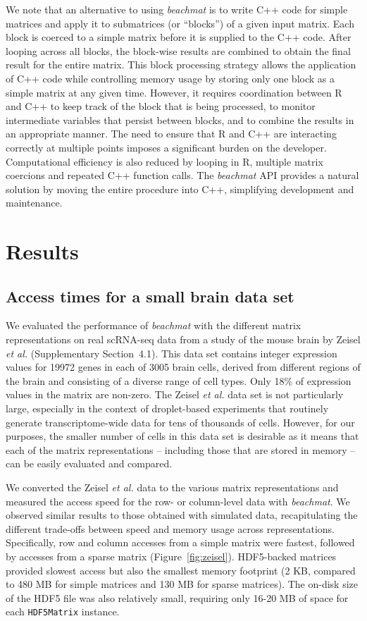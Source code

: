 \documentclass[10pt,letterpaper]{article}
\newcommand{\suppsecrealzeisel}{4.1}
\newcommand{\beachmat}{\textit{beachmat}}
\newcommand{\code}[1]{\texttt{#1}}
\begin{document}
We note that an alternative to using \beachmat{} is to write C++ code for simple matrices and apply it to submatrices (or ``blocks'') of a given input matrix.
Each block is coerced to a simple matrix before it is supplied to the C++ code.
After looping across all blocks, the block-wise results are combined to obtain the final result for the entire matrix.
This block processing strategy allows the application of C++ code while controlling memory usage by storing only one block as a simple matrix at any given time.
However, it requires coordination between R and C++ to keep track of the block that is being processed, to monitor intermediate variables that persist between blocks, and to combine the results in an appropriate manner.
The need to ensure that R and C++ are interacting correctly at multiple points imposes a significant burden on the developer.
Computational efficiency is also reduced by looping in R, multiple matrix coercions and repeated C++ function calls.
The \beachmat{} API provides a natural solution by moving the entire procedure into C++, simplifying development and maintenance.

\section*{Results}

\subsection*{Access times for a small brain data set}
We evaluated the performance of \beachmat{} with the different matrix representations on real scRNA-seq data from a study of the mouse brain by Zeisel \textit{et al.} \cite{zeisel2015brain} (Supplementary Section~\suppsecrealzeisel{}). 
This data set contains integer expression values for 19972 genes in each of 3005 brain cells, derived from different regions of the brain and consisting of a diverse range of cell types.
Only 18\% of expression values in the matrix are non-zero.
The Zeisel \textit{et al.} data set is not particularly large, especially in the context of droplet-based experiments that routinely generate transcriptome-wide data for tens of thousands of cells.
However, for our purposes, the smaller number of cells in this data set is desirable as it means that each of the matrix representations -- including those that are stored in memory -- can be easily evaluated and compared.

We converted the Zeisel \textit{et al.} data to the various matrix representations and measured the access speed for the row- or column-level data with \beachmat{}.
We observed similar results to those obtained with simulated data, recapitulating the different trade-offs between speed and memory usage across representations.
Specifically, row and column accesses from a simple matrix were fastest, followed by accesses from a sparse matrix (Figure~\ref{fig:zeisel}).
HDF5-backed matrices provided slowest access but also the smallest memory footprint (2 KB, compared to 480 MB for simple matrices and 130 MB for sparse matrices).
The on-disk size of the HDF5 file was also relatively small, requiring only 16-20 MB of space for each \code{HDF5Matrix} instance.
\end{document}
